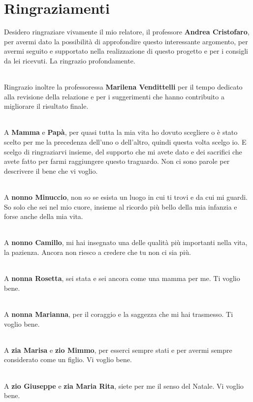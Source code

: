 \documentclass[main]{subfiles}
\begin{document}
\section*{Ringraziamenti}
Desidero ringraziare vivamente il mio relatore, il professore \textbf{Andrea Cristofaro}, per avermi dato la possibilità di
approfondire questo interessante argomento, per avermi seguito e supportato nella realizzazione di questo progetto e
per i consigli da lei ricevuti. La ringrazio profondamente.

\noindent\\
Ringrazio inoltre la professoressa \textbf{Marilena Vendittelli} per il tempo dedicato alla revisione della relazione e per 
i suggerimenti che hanno contribuito a migliorare il risultato finale.

\noindent\\
A \textbf{Mamma} e \textbf{Papà}, per quasi tutta la mia vita ho dovuto scegliere o è stato scelto per me la precedenza dell'uno o dell'altro, 
quindi questa volta scelgo io.
E scelgo di ringraziarvi insieme, del supporto che mi avete dato e dei sacrifici che avete fatto
per farmi raggiungere questo traguardo. Non ci sono parole per descrivere il bene che vi voglio.

\noindent\\
A \textbf{nonno Minuccio}, non so se esista un luogo in cui ti trovi e da cui mi guardi. So solo che sei nel mio cuore,
insieme al ricordo più bello della mia infanzia e forse anche della mia vita. 

\noindent\\
A \textbf{nonno Camillo}, mi hai insegnato una delle qualità più importanti nella vita, la pazienza.
Ancora non riesco a credere che tu non ci sia più. 

\noindent\\
A \textbf{nonna Rosetta}, sei stata e sei ancora come una mamma per me. Ti voglio bene.

\noindent\\
A \textbf{nonna Marianna}, per il coraggio e la saggezza che mi hai trasmesso. Ti voglio bene.

\noindent\\
A \textbf{zia Marisa} e \textbf{zio Mimmo}, per esserci sempre stati e per avermi sempre considerato come un figlio. Vi voglio bene.

\noindent\\
A \textbf{zio Giuseppe} e \textbf{zia Maria Rita}, siete per me il senso del Natale. Vi voglio bene.
\end{document}
